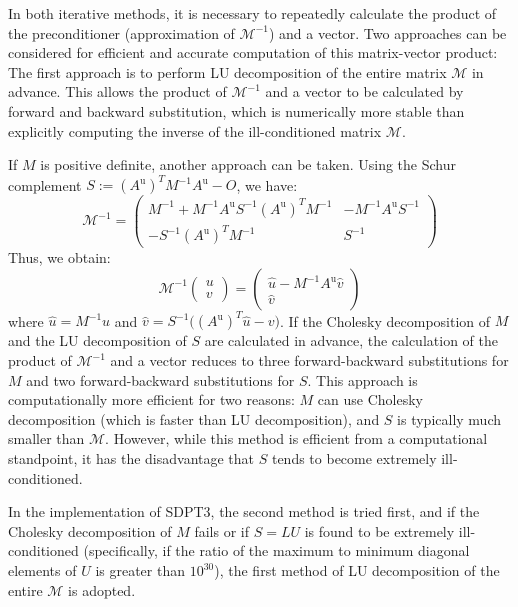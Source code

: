 In both iterative methods, it is necessary to repeatedly calculate the product of the preconditioner (approximation of $\mathcal{M}^{-1}$) and a vector.
Two approaches can be considered for efficient and accurate computation of this matrix-vector product:
The first approach is to perform LU decomposition of the entire matrix $\mathcal{M}$ in advance.
This allows the product of $\mathcal{M}^{-1}$ and a vector to be calculated by forward and backward substitution, which is numerically more stable than explicitly computing the inverse of the ill-conditioned matrix $\mathcal{M}$.

If $M$ is positive definite, another approach can be taken. 
Using the Schur complement $S := (A^{\text{u}})^T M^{-1} A^{\text{u}} - O$, we have:
\[
\mathcal{M}^{-1}=\begin{pmatrix}
    M^{-1} + M^{-1} A^{\text{u}} S^{-1} (A^{\text{u}})^T M^{-1} & -M^{-1} A^{\text{u}} S^{-1} \\
    -S^{-1} (A^{\text{u}})^T M^{-1} & S^{-1}
\end{pmatrix}
\]
Thus, we obtain:
\[
    \mathcal{M}^{-1}\begin{pmatrix}u \\ v \end{pmatrix} = \begin{pmatrix} \hat{u} - M^{-1} A^{\text{u}} \hat{v} \\ \hat{v} \end{pmatrix}
\]
where $\hat{u} = M^{-1} u$ and $\hat{v} = S^{-1}\big((A^{\text{u}})^T \hat{u} - v \big)$.
If the Cholesky decomposition of $M$ and the LU decomposition of $S$ are calculated in advance, the calculation of the product of $\mathcal{M}^{-1}$ and a vector reduces to three forward-backward substitutions for $M$ and two forward-backward substitutions for $S$.
This approach is computationally more efficient for two reasons: $M$ can use Cholesky decomposition (which is faster than LU decomposition), and $S$ is typically much smaller than $\mathcal{M}$.
However, while this method is efficient from a computational standpoint, it has the disadvantage that $S$ tends to become extremely ill-conditioned.

In the implementation of SDPT3, the second method is tried first, and if the Cholesky decomposition of $M$ fails or if $S=LU$ is found to be extremely ill-conditioned (specifically, if the ratio of the maximum to minimum diagonal elements of $U$ is greater than $10^{30}$), the first method of LU decomposition of the entire $\mathcal{M}$ is adopted.

